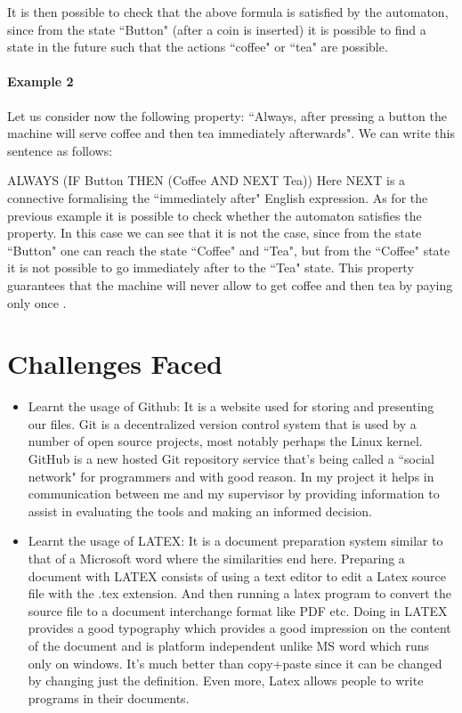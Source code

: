 \documentclass[a4paper,10pt]{report}
\begin{document}
It is then possible to check that the above formula is satisfied by the automaton, since from the state ``Button" (after a coin is inserted) it is possible to find a state in the future such that the actions ``coffee" or ``tea" are possible.
\paragraph{Example 2}
Let us consider now the following property: ``Always, after pressing a button the machine will serve coffee and then tea immediately afterwards". We can write this sentence as follows:

ALWAYS (IF Button THEN (Coffee AND NEXT Tea))
Here NEXT is a connective formalising the ``immediately after" English expression. As for the previous example it is possible to check whether the automaton satisfies the property. In this case we can see that it is not the case, since from the state ``Button" one can reach the state ``Coffee" and ``Tea", but from the ``Coffee" state it is not possible to go immediately after to the ``Tea" state. This property guarantees that the machine will never allow to get coffee and then tea by paying only once \cite{D.Jackson}.

\section{Challenges Faced}
\label{Challenges faced}

\begin{itemize}
\item Learnt the usage of Github: It is a website used for storing and presenting our files. Git is a decentralized version control system that is used by a number of open source projects, most notably perhaps the Linux kernel. GitHub is a new hosted Git repository service that's being called a ``social network" for programmers and with good reason. In my project it helps in communication between me and my supervisor by providing information to assist in evaluating the tools and making an informed decision.
\item Learnt the usage of LATEX: It is a document preparation system similar to that of a Microsoft word where the similarities end here. Preparing a document with LATEX consists of using a text editor to edit a Latex source file with the .tex extension. And then running a latex program to convert the source file to a document interchange format like PDF etc. Doing in LATEX provides a good typography which provides a good impression on the content of the document and is platform independent unlike MS word which runs only on windows. It's much better than copy+paste since it can be changed by changing just the definition. Even more, Latex allows people to write programs in their documents. 
\end{itemize}
\end{document}
